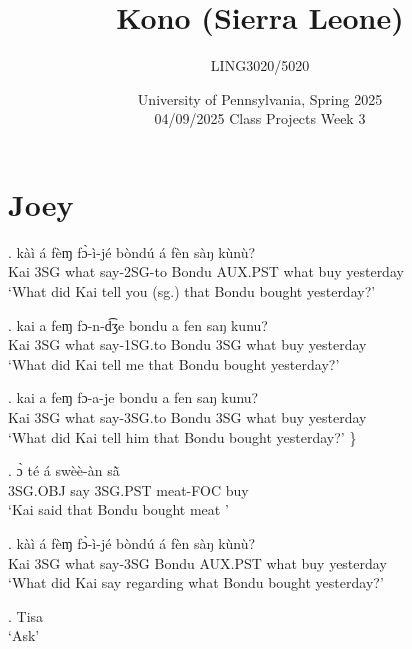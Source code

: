 \documentclass{assets/fieldnotes}
\title{Kono (Sierra Leone)}
\author{LING3020/5020}
\date{University of Pennsylvania, Spring 2025\\04/09/2025 Class Projects Week 3}
\begin{document}
\maketitle

\maketitle
\tableofcontents

\section{Joey}


\exg. kàì á fèɱ fɔ̀-ì-jé bòndú á fèn sàŋ kùnù?\\
Kai 3SG what say-2SG-to Bondu AUX.PST what buy yesterday\\
`What did Kai tell you (sg.) that Bondu bought yesterday?'  

\exg. kai a feɱ fɔ-n-d͡ʒe bondu a fen saŋ kunu?\\
Kai 3SG what say-1SG.to Bondu 3SG what buy yesterday\\
`What did Kai tell me that Bondu bought yesterday?' 


\exg. kai a feɱ fɔ-a-je bondu a fen saŋ kunu?\\
Kai 3SG what say-3SG.to Bondu 3SG what buy yesterday\\
`What did Kai tell him that Bondu bought yesterday?' \}


\exg. ɔ̀ té á swèè-àn sã̀\\
3SG.OBJ say 3SG.PST meat-FOC buy\\
`Kai said that Bondu bought meat ' 


\exg. kàì á fèɱ fɔ̀-ì-jé bòndú á fèn sàŋ kùnù?\\ 
Kai 3SG what say-3SG Bondu AUX.PST what buy yesterday\\
`What did Kai say regarding what Bondu bought yesterday?'  

\exg. Tisa\\
`Ask' \\ 
\end{document}
